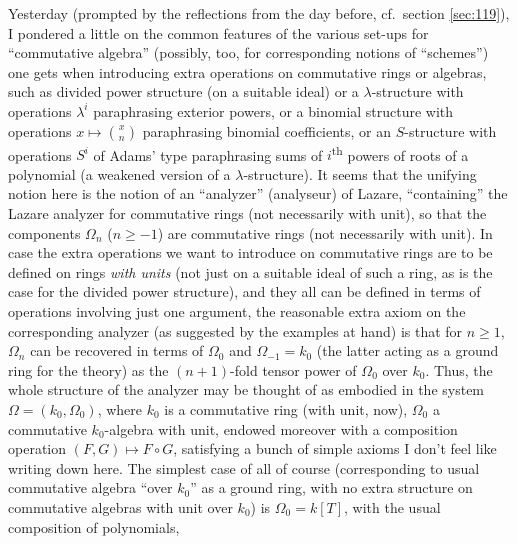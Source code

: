 \bigbreak

\noindent\hfill{}\par

\label{sec:120}%
Yesterday (prompted by the reflections from the day before, cf.\
section \ref{sec:119}), I pondered a little on the common features of
the various set-ups for ``commutative algebra'' (possibly, too, for
corresponding notions of ``schemes'') one gets when introducing extra
operations on commutative rings or algebras, such as divided power
structure (on a suitable ideal) or a $\lambda$-structure with
operations $\lambda^i$ paraphrasing exterior powers, or a binomial
structure with operations $x\mapsto\binom xn$ paraphrasing binomial
coefficients, or an $S$-structure with operations $S^i$ of Adams' type
paraphrasing sums of $i$\textsuperscript{th} powers of roots of a
polynomial (a weakened version of a $\lambda$-structure). It seems
that the unifying notion here is the notion of an ``analyzer''
(analyseur) of Lazare, ``containing'' the Lazare analyzer for
commutative rings (not necessarily with unit), so that the components
$\Omega_n$ ($n\ge-1$) are commutative rings (not necessarily with
unit). In case the extra operations we want to introduce on
commutative rings are to be defined on rings \emph{with units} (not
just on a suitable ideal of such a ring, as is the case for the
divided power structure), and they all can be defined in terms of
operations involving just one argument, the reasonable extra axiom on
the corresponding analyzer (as suggested by the examples at hand) is
that for $n\ge1$, $\Omega_n$ can be recovered in terms of $\Omega_0$
and $\Omega_{-1}=k_0$ (the latter acting as a ground ring for the
theory) as the $(n+1)$-fold tensor power of $\Omega_0$ over
$k_0$. Thus, the whole structure of the analyzer may be thought of as
embodied in the system $\Omega=(k_0,\Omega_0)$, where $k_0$ is a
commutative ring (with unit, now), $\Omega_0$ a commutative
$k_0$-algebra with unit, endowed moreover with a composition operation
$(F,G)\mapsto F\circ G$, satisfying a bunch of simple axioms I don't
feel like writing down here. The simplest case of all of course
(corresponding to usual commutative algebra ``over $k_0$'' as a ground
ring, with no extra structure on commutative algebras with unit over
$k_0$) is $\Omega_0=k[T]$, with the usual composition of polynomials,
